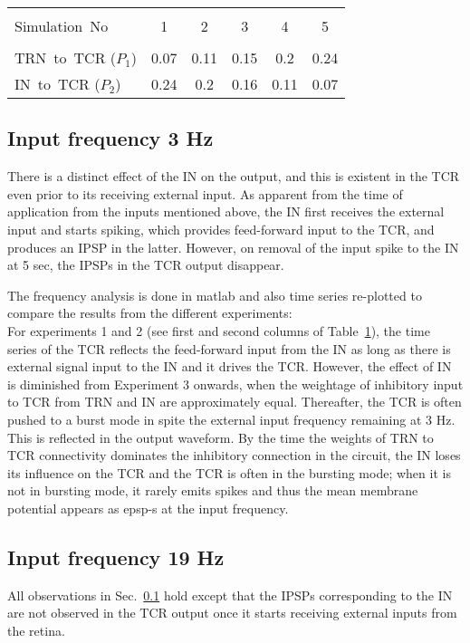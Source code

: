 \documentclass[11pt,a4paper]{article}
\begin{document}
\begin{table}
\begin{tabular}{||l|c|c|c|c|c|}
\hline \\
\mbox{Simulation No} & 1 & 2 & 3 & 4 & 5 \\
\hline \\
\mbox{TRN to TCR} ($P_1$) & 0.07 & 0.11 & 0.15 & 0.2 & 0.24 \\
\mbox{IN to TCR} ($P_2$)  & 0.24 & 0.2 & 0.16 & 0.11 & 0.07 \\
\hline
\end{tabular}
\label{tab:2}
\end{table}

\subsection{Input frequency 3 Hz}
\label{sec:11}
There is a distinct effect of the IN on the output, and this is existent in the TCR even prior to its receiving external input. As apparent from the time of application from the inputs mentioned above, the IN first receives the external input and starts spiking, which provides feed-forward input to the TCR, and produces an IPSP in the latter. However, on removal of the input spike to the IN at 5 sec, the IPSPs in the TCR output disappear.

The frequency analysis is done in matlab and also time series re-plotted to compare the results from the different experiments:\\
For experiments 1 and 2 (see first and second columns of Table~\ref{tab:2}), the time series of the TCR reflects the feed-forward input from the IN as long as there is external signal input to the IN and it drives the TCR. However, the effect of IN is diminished from Experiment 3 onwards, when the weightage of inhibitory input to TCR from TRN and IN are approximately equal. Thereafter, the TCR is often pushed to a burst mode in spite the external input frequency remaining at 3 Hz. This is reflected in the output waveform. By the time the weights of TRN to TCR connectivity dominates the inhibitory connection in the circuit, the IN loses its influence on the TCR and the TCR is often in the bursting mode; when it is not in bursting mode, it rarely emits spikes and thus the mean membrane potential appears as epsp-s at the input frequency.
\subsection{Input frequency 19 Hz}
\label{sec:12}
All observations in Sec.~\ref{sec:11} hold except that the IPSPs corresponding to the IN are not observed in the TCR output once it starts receiving external inputs from the retina.
\end{document}
